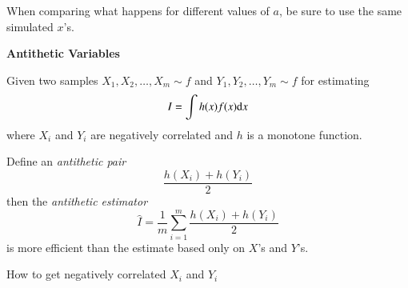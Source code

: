 \documentclass[captions=tableheading]{scrbook}
\begin{document}
When comparing what happens for different values of $a$, be sure to use the same simulated $x$'s.



\textbf{Antithetic Variables}

Given two samples \(X_{1},X_{2},\ldots,X_{m}\sim f  \)  and  \(Y_{1},Y_{2},\ldots,Y_{m}\sim f  \) for estimating 
\[
I = \int h(x) f(x) \mathrm{d} x
\] 
where $X_{i}$ and $Y_{i}$ are negatively correlated and $h$ is a monotone function.

Define an \emph{antithetic pair}
\[
\frac{h(X_{i}) + h(Y_{i})}{2}
\]
then the \emph{antithetic estimator}
\[
\hat{I}=\frac{1}{m} \sum_{i = 1}^{m}\frac{h(X_{i}) + h(Y_{i})}{2}
\]
is more efficient than the estimate based only on $X$'s and $Y$'s.

How to get negatively correlated \(X_{i}\) and \(Y_{i}\)
\end{document}
